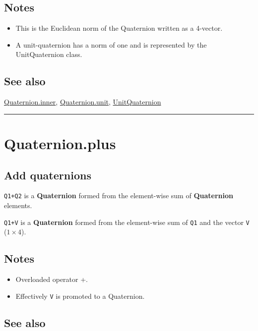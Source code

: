 \subsection*{Notes}
\begin{itemize}
  \item This is the Euclidean norm of the Quaternion written as a 4-vector.
  \item A unit-quaternion has a norm of one and is represented by the    UnitQuaternion class.
\end{itemize}

\subsection*{See also}


\hyperlink{Quaternion.inner}{\color{blue} Quaternion.inner}, \hyperlink{Quaternion.unit}{\color{blue} Quaternion.unit}, \hyperlink{UnitQuaternion}{\color{blue} UnitQuaternion}

\vspace{1.5ex}\hrule

\hypertarget{Quaternion.plus}{\section*{Quaternion.plus}}
\subsection*{Add quaternions}


\texttt{Q1+Q2} is a \textbf{\color{red} Quaternion} formed from the element-wise sum of \textbf{\color{red} Quaternion} elements.



\texttt{Q1+V}  is a \textbf{\color{red} Quaternion} formed from the element-wise sum of \texttt{Q1} and the
vector \texttt{V} ($1 \times 4$).


\subsection*{Notes}
\begin{itemize}
  \item Overloaded operator \textquotesingle +\textquotesingle .
  \item Effectively \texttt{V} is promoted to a Quaternion.
\end{itemize}

\subsection*{See also}


